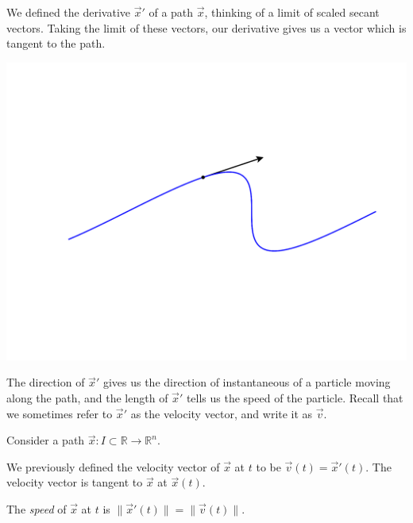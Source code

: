 \documentclass{ximera}
\begin{document}
We defined the derivative $\vec{x}'$ of a path $\vec{x}$, thinking of a limit of scaled secant vectors. Taking the limit of these vectors, our derivative gives us a vector which is tangent to the path.

\begin{image}
\includegraphics[width=\textwidth]{CalcPlot3D-vel_vector}
\end{image}

The direction of $\vec{x}'$ gives us the direction of instantaneous of a particle moving along the path, and the length of $\vec{x}'$ tells us the speed of the particle. Recall that we sometimes refer to $\vec{x}'$ as the velocity vector, and write it as $\vec{v}$.

\begin{definition}
Consider a path $\vec{x}:I\subset\mathbb{R}\rightarrow\mathbb{R}^n$.

We previously defined the velocity vector of $\vec{x}$ at $t$ to be $\vec{v}(t) = \vec{x}'(t)$. The velocity vector is tangent to $\vec{x}$ at $\vec{x}(t)$.

The \emph{speed} of $\vec{x}$ at $t$ is $\|\vec{x}'(t)\| = \|\vec{v}(t)\|$.
\end{definition}
\end{document}

